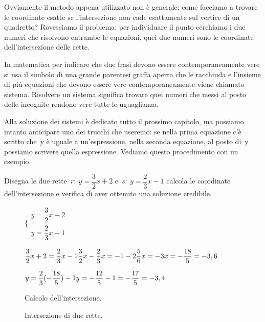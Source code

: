 \begin{exrig}
Ovviamente il metodo appena utilizzato non è generale: come facciamo a trovare 
le coordinate esatte se l'intersezione non cade esattamente sul vertice di  
un quadretto? Rovesciamo il problema: per individuare il punto 
cerchiamo i due numeri che risolvono entrambe le equazioni, quei due numeri
sono le coordinate dell'intersezione delle rette.

In matematica per indicare che due frasi devono essere contemporaneamente 
vere si usa il simbolo di una grande parentesi graffa aperta che le racchiuda 
e l'insieme di più equazioni che devono essere vere contemporaneamente viene
chiamato sistema. Risolvere un sistema significa trovare quei numeri che 
messi al posto delle incognite rendono vere tutte le uguaglianza.

Alla soluzione dei sistemi è dedicato tutto il prossimo capitolo, ma possiamo 
intanto anticipare uno dei trucchi che useremo: se nella prima equazione c'è 
scritto che~y è uguale a un'espressione, nella seconda equazione, al posto 
di~y possiamo scrivere quella espressione. Vediamo questo procedimento con un 
esempio.

 \begin{esempio}
  Disegna le due rette~$r:~y = \dfrac{3}{2} x +2$ e~$s:~y = \dfrac{2}{3} x -1$ 
  calcola le coordinate dell'intersezione e verifica di aver
  ottenuto una soluzione credibile.
\begin{inaccessibleblock}
 \begin{figure}[h]
 \centering
 \begin{minipage}[]{.60\textwidth}
   $\bigg \{
     \begin{array}{l}
      y = \dfrac{3}{2} x +2 \\
      y = \dfrac{2}{3} x -1
     \end{array}
   $
  
   $\dfrac{3}{2} x +2 = \dfrac{2}{3} x -1 \newline
    \dfrac{3}{2} x - \dfrac{2}{3} x = -1 -2 \newline
    \dfrac{5}{6} x = -3 \newline
    x = -\dfrac{18}{5} = -3,6$
   
   $y = \dfrac{2}{3} (-\dfrac{18}{5}) -1 \newline
    y = - \dfrac{12}{5} -1 = - \dfrac{17}{5} = -3,4$
  \caption{Calcolo dell'intersezione.}\label{fig:elementi}
 \end{minipage}
 \begin{minipage}[]{.30\textwidth}
   \centering
  \caption{Intersezione di due rette.}\label{fig:intersezione02}
 \end{minipage}
\end{figure}
\end{inaccessibleblock}
 \end{esempio}
 

\end{exrig}
